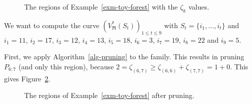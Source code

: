 \documentclass[
  11pt,
  a4paper,
]{article}
\theoremstyle{plain}
\theoremstyle{plain}
\theoremstyle{plain}
\theoremstyle{definition}
\theoremstyle{definition}
\theoremstyle{remark}
\begin{document}
\begin{figure}


\caption{\label{fig-zetas}The regions of Example~\ref{exm-toy-forest}
with the \(\zeta_k\) values.}

\end{figure}%

We want to compute the curve
\(\left(V^*_{\mathfrak{R}}\left(S_t\right)\right)_{1\leq t\leq 9}\) with
\(S_t=\{i_1,\dotsc, i_t\}\) and \(i_1=11\), \(i_2=17\), \(i_3=12\),
\(i_4=13\), \(i_5=18\), \(i_6=3\), \(i_7=19\), \(i_8=22\) and \(i_9=5\).

First, we apply  Algorithm~\ref{alg-pruning}  to the family. This
results in pruning \(P_{6:7}\) (and only this region), because
\(2=\zeta_{(6, 7)}\geq \zeta_{(6, 6)}+\zeta_{(7, 7)}=1+0\). This gives
Figure~\ref{fig-pruned}.

\begin{figure}


\caption{\label{fig-pruned}The regions of Example~\ref{exm-toy-forest}
after pruning.}

\end{figure}%
\end{document}
